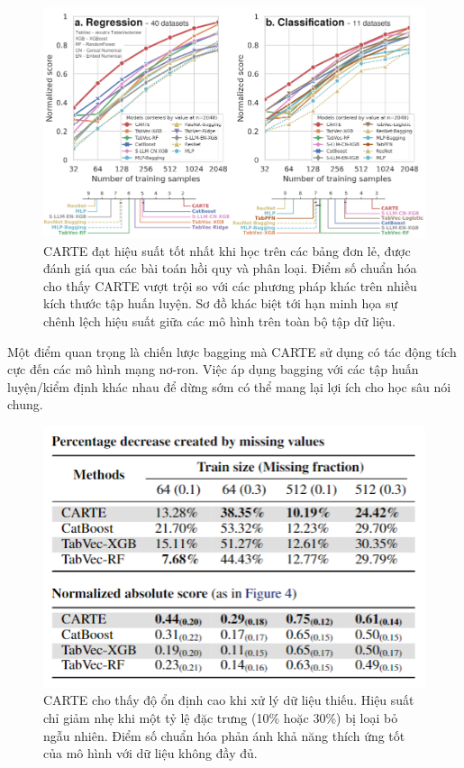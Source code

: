 \documentclass{article}
\begin{document}
\begin{figure} 
    \centering
    \includegraphics[scale = 0.7]{carte_performance_comparison.png}
    \caption{CARTE đạt hiệu suất tốt nhất khi học trên các bảng đơn lẻ, được đánh giá qua các bài toán hồi quy và phân loại. Điểm số chuẩn hóa cho thấy CARTE vượt trội so với các phương pháp khác trên nhiều kích thước tập huấn luyện. Sơ đồ khác biệt tới hạn minh họa sự chênh lệch hiệu suất giữa các mô hình trên toàn bộ tập dữ liệu.}
    \label{fig:carte_performance_comparison}
\end{figure}

Một điểm quan trọng là chiến lược bagging mà CARTE sử dụng có tác động tích cực đến các mô hình mạng nơ-ron. Việc áp dụng bagging với các tập huấn luyện/kiểm định khác nhau để dừng sớm có thể mang lại lợi ích cho học sâu nói chung.

\begin{figure} 
    \centering
    \includegraphics[scale = 0.8]{carte_robust_to_missing_value.png}
    \caption{CARTE cho thấy độ ổn định cao khi xử lý dữ liệu thiếu. Hiệu suất chỉ giảm nhẹ khi một tỷ lệ đặc trưng (10\% hoặc 30\%) bị loại bỏ ngẫu nhiên. Điểm số chuẩn hóa phản ánh khả năng thích ứng tốt của mô hình với dữ liệu không đầy đủ.}
    \label{fig:carte_robust_to_missing_value}
\end{figure}
\end{document}
